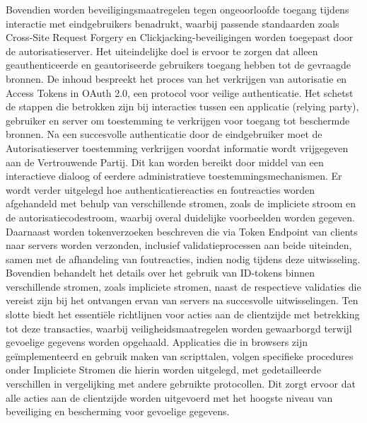 \newline
Bovendien worden beveiligingsmaatregelen tegen ongeoorloofde toegang tijdens interactie met eindgebruikers benadrukt, waarbij passende standaarden zoals Cross-Site Request Forgery en Clickjacking-beveiligingen worden toegepast door de autorisatieserver.
Het uiteindelijke doel is ervoor te zorgen dat alleen geauthenticeerde en geautoriseerde gebruikers toegang hebben tot de gevraagde bronnen.
\newline
De inhoud bespreekt het proces van het verkrijgen van autorisatie en Access Tokens in OAuth 2.0, een protocol voor veilige authenticatie. Het schetst de stappen die betrokken zijn bij interacties tussen een applicatie (relying party), gebruiker en server om toestemming te verkrijgen voor toegang tot beschermde bronnen.
\newline
Na een succesvolle authenticatie door de eindgebruiker moet de Autorisatieserver toestemming verkrijgen voordat informatie wordt vrijgegeven aan de Vertrouwende Partij. Dit kan worden bereikt door middel van een interactieve dialoog of eerdere administratieve toestemmingsmechanismen.
\newline
Er wordt verder uitgelegd hoe authenticatiereacties en foutreacties worden afgehandeld met behulp van verschillende stromen, zoals de impliciete stroom en de autorisatiecodestroom, waarbij overal duidelijke voorbeelden worden gegeven.
\newline
Daarnaast worden tokenverzoeken beschreven die via Token Endpoint van clients naar servers worden verzonden, inclusief validatieprocessen aan beide uiteinden, samen met de afhandeling van foutreacties, indien nodig tijdens deze uitwisseling.
Bovendien behandelt het details over het gebruik van ID-tokens binnen verschillende stromen, zoals impliciete stromen, naast de respectieve validaties die vereist zijn bij het ontvangen ervan van servers na succesvolle uitwisselingen.
Ten slotte biedt het essentiële richtlijnen voor acties aan de clientzijde met betrekking tot deze transacties, waarbij veiligheidsmaatregelen worden gewaarborgd terwijl gevoelige gegevens worden opgehaald. Applicaties die in browsers zijn geïmplementeerd en gebruik maken van scripttalen, volgen specifieke procedures onder Impliciete Stromen die hierin worden uitgelegd, met gedetailleerde verschillen in vergelijking met andere gebruikte protocollen.
\newline
\newline
Dit zorgt ervoor dat alle acties aan de clientzijde worden uitgevoerd met het hoogste niveau van beveiliging en bescherming voor gevoelige gegevens.
